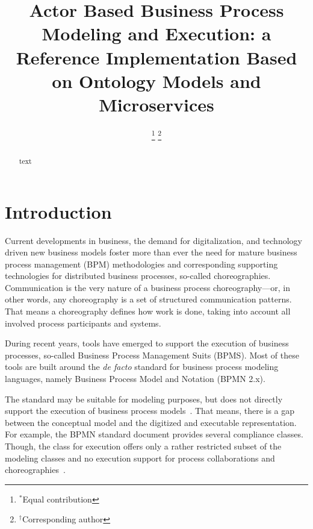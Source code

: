 \documentclass[conference]{IEEEtran}
\newcommand{\citep}{\cite}
\begin{document}
\title{Actor Based Business Process Modeling and Execution: a Reference Implementation Based on Ontology Models and Microservices}

\author
{
\thanks{$^*$Equal contribution}
\thanks{$^\dagger$Corresponding author}
}

\maketitle

\begin{abstract}
text  
\end{abstract}

\IEEEpeerreviewmaketitle

\section{Introduction}
\label{Introduction}

Current developments in business, the demand for digitalization, and technology driven new business models foster more than ever the need for mature business process management (BPM) methodologies and corresponding supporting technologies for distributed business processes, so-called choreographies. Communication is the very nature of a business process choreography---or, in other words, any choreography is a set of structured communication patterns. That means a choreography defines how work is done, taking into account all involved process participants and systems.

During recent years, tools have emerged to support the execution of business processes, so-called Business Process Management Suits (BPMS). Most of these tools are built around the \emph{de facto} standard for business process modeling languages, namely Business Process Model and Notation (BPMN 2.x).

The standard may be suitable for modeling purposes, but does not directly support the execution of business process models~\citep{OMG:2013wz}\citep{Silver.2011}\citep{Borger:2011ib}. That means, there is a gap between the conceptual model and the digitized and executable representation. For example, the BPMN standard document provides several compliance classes. Though, the class for execution offers only a rather restricted subset of the modeling classes and no execution support for process collaborations and choreographies~\cite{OMG:2013wz}. 
\end{document}
